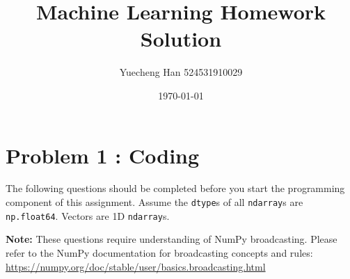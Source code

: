 \documentclass[11pt,addpoints,answers]{exam}
\title{\textbf{Machine Learning Homework Solution}}
\author{Yuecheng Han 524531910029}
\date{\today}
\begin{document}
	\maketitle
	
	\section*{Problem 1 : Coding}
	\label{sec:pseudocode}
	
	The following questions should be completed before you start the programming component of this assignment. Assume the \texttt{dtype}s of all \texttt{ndarray}s are \texttt{np.float64}. Vectors are 1D \texttt{ndarray}s.
	
	\textbf{Note:} These questions require understanding of NumPy broadcasting. Please refer to the NumPy documentation for broadcasting concepts and rules: \url{https://numpy.org/doc/stable/user/basics.broadcasting.html}
	
\end{document}
